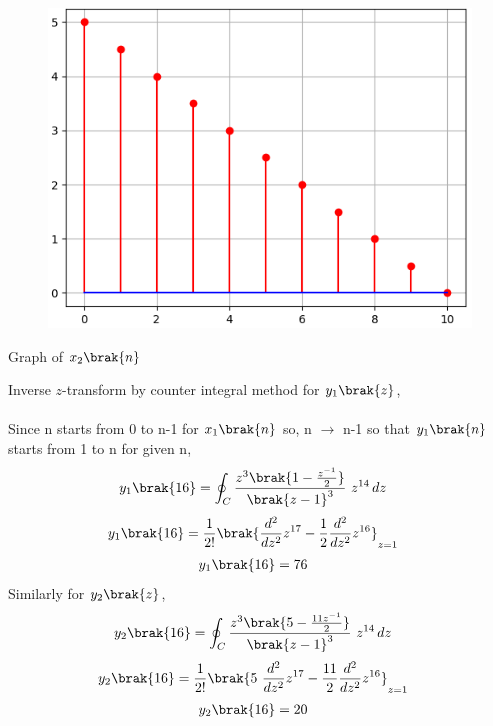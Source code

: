 \documentclass[journal,12pt,twocolumn]{IEEEtran}
\theoremstyle{remark}
\begin{document}
\begin{figure}[h]
    \centering
    \includegraphics[scale=0.60]{ncert-maths/10/5/4/2/figs/py_5.png}
    \label{fig:x2n}
\end{figure}
\begin{center}
    Graph of $x_2\brak{n}$\\[20ex]
\end{center}
Inverse $z$-transform by counter integral method for  $y_1\brak{z}$,\\\\Since n starts from 0 to n-1 for $x_1\brak{n}$ so, n $\to$ n-1 so that $y_1\brak{n}$ starts from 1 to n for given n,\\
\begin{align}
y_1\brak{16}&=\oint_C \frac{z^3\brak{1-\frac{z^{-1}}{2}}}{\brak{z-1}^3}\ z^{14}\, dz
\end{align}
\begin{align}
y_1\brak{16}&=\frac{1}{2!}\brak{\frac{d^2}{dz^2}z^{17}-\frac{1}{2}\frac{d^2}{dz^2}z^{16}}_{z=1}  
\end{align}
\begin{align}
y_1\brak{16}&=76
\end{align}
Similarly for $y_2\brak{z}$,
\begin{align}
y_2\brak{16}&=\oint_C \frac{z^3\brak{5-\frac{11z^{-1}}{2}}}{\brak{z-1}^3}\ z^{14}\, dz
\end{align}
\begin{align}
y_2\brak{16}&=\frac{1}{2!}\brak{5\ \frac{d^2}{dz^2}z^{17}-\frac{11}{2}\frac{d^2}{dz^2}z^{16}}_{z=1}  
\end{align}
\begin{align}
y_2\brak{16}&=20
\end{align}
\end{document}
